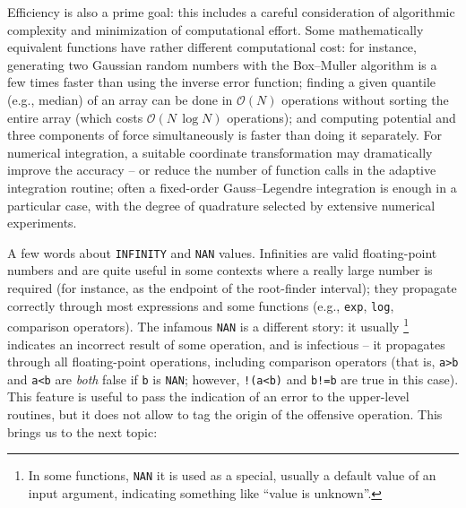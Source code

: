 \documentclass[12pt]{article}
\begin{document}
Efficiency is also a prime goal: this includes a careful consideration of algorithmic complexity and minimization of computational effort. Some mathematically equivalent functions have rather different computational cost: for instance, generating two Gaussian random numbers with the Box--Muller algorithm is a few times faster than using the inverse error function; finding a given quantile (e.g., median) of an array can be done in $\mathcal{O}(N)$ operations without sorting the entire array (which costs $\mathcal{O}(N\,\log N)$ operations); and computing potential and three components of force simultaneously is faster than doing it separately. For numerical integration, a suitable coordinate transformation may dramatically improve the accuracy -- or reduce the number of function calls in the adaptive integration routine; often a fixed-order Gauss--Legendre integration is enough in a particular case, with the degree of quadrature selected by extensive numerical experiments.

A few words about \texttt{INFINITY} and \texttt{NAN} values. Infinities are valid floating-point numbers and are quite useful in some contexts where a really large number is required (for instance, as the endpoint of the root-finder interval); they propagate correctly through most expressions and some functions (e.g., \texttt{exp}, \texttt{log}, comparison operators). The infamous \texttt{NAN} is a different story: it usually%
\footnote{In some functions, \texttt{NAN} it is used as a special, usually a default value of an input argument, indicating something like ``value is unknown''.}
indicates an incorrect result of some operation, and is infectious -- it propagates through all floating-point operations, including comparison operators (that is, \texttt{a>b} and \texttt{a<b} are \textit{both} false if \texttt{b} is \texttt{NAN}; however, \texttt{!(a<b)} and \texttt{b!=b} are true in this case). This feature is useful to pass the indication of an error to the upper-level routines, but it does not allow to tag the origin of the offensive operation. This brings us to the next topic:
\end{document}
